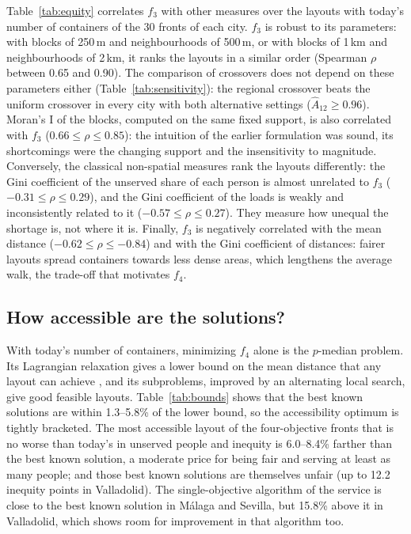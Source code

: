 Table~\ref{tab:equity} correlates $f_3$ with other measures over the layouts with today's number of containers of the 30 fronts of each city. $f_3$ is robust to its parameters: with blocks of 250\,m and neighbourhoods of 500\,m, or with blocks of 1\,km and neighbourhoods of 2\,km, it ranks the layouts in a similar order (Spearman $\rho$ between 0.65 and 0.90). The comparison of crossovers does not depend on these parameters either (Table~\ref{tab:sensitivity}): the regional crossover beats the uniform crossover in every city with both alternative settings ($\hat{A}_{12} \geq 0.96$). Moran's I of the blocks, computed on the same fixed support, is also correlated with $f_3$ ($0.66 \leq \rho \leq 0.85$): the intuition of the earlier formulation was sound, its shortcomings were the changing support and the insensitivity to magnitude. Conversely, the classical non-spatial measures rank the layouts differently: the Gini coefficient of the unserved share of each person is almost unrelated to $f_3$ ($-0.31 \leq \rho \leq 0.29$), and the Gini coefficient of the loads is weakly and inconsistently related to it ($-0.57 \leq \rho \leq 0.27$). They measure how unequal the shortage is, not where it is. Finally, $f_3$ is negatively correlated with the mean distance ($-0.62 \leq \rho \leq -0.84$) and with the Gini coefficient of distances: fairer layouts spread containers towards less dense areas, which lengthens the average walk, the trade-off that motivates $f_4$.



\subsection{How accessible are the solutions?}


With today's number of containers, minimizing $f_4$ alone is the $p$-median problem. Its Lagrangian relaxation gives a lower bound on the mean distance that any layout can achieve \cite{beasley1993lagrangean}, and its subproblems, improved by an alternating local search, give good feasible layouts. Table~\ref{tab:bounds} shows that the best known solutions are within 1.3--5.8\% of the lower bound, so the accessibility optimum is tightly bracketed. The most accessible layout of the four-objective fronts that is no worse than today's in unserved people and inequity is 6.0--8.4\% farther than the best known solution, a moderate price for being fair and serving at least as many people; and those best known solutions are themselves unfair (up to 12.2 inequity points in Valladolid). The single-objective algorithm of the service is close to the best known solution in Málaga and Sevilla, but 15.8\% above it in Valladolid, which shows room for improvement in that algorithm too.

